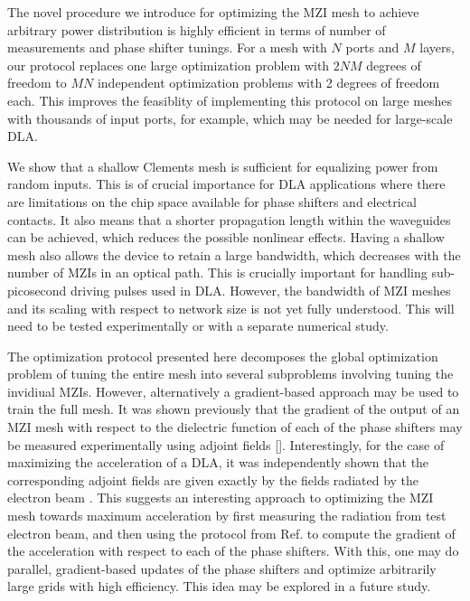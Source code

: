 \documentclass[%
 reprint,
 amsmath,amssymb,
 aps,
prstab,
floatfix,
]{revtex4-1}
\begin{document}
The novel procedure we introduce for optimizing the MZI mesh to achieve arbitrary power distribution is highly efficient in terms of number of measurements and phase shifter tunings.  For a mesh with $N$ ports and $M$ layers, our protocol replaces one large optimization problem with $2NM$ degrees of freedom to $MN$ independent optimization problems with 2 degrees of freedom each.  This improves the feasiblity of implementing this protocol on large meshes with thousands of input ports, for example, which may be needed for large-scale DLA.

We show that a shallow Clements mesh is sufficient for equalizing power from random inputs.  This is of crucial importance for DLA applications where there are limitations on the chip space available for phase shifters and electrical contacts.  It also means that a shorter propagation length within the waveguides can be achieved, which reduces the possible nonlinear effects.  Having a shallow mesh also allows the device to retain a large bandwidth, which decreases with the number of MZIs in an optical path.  This is crucially important for handling sub-picosecond driving pulses used in DLA.  However, the bandwidth of MZI meshes and its scaling with respect to network size is not yet fully understood.  This will need to be tested experimentally or with a separate numerical study.

The optimization protocol presented here decomposes the global optimization problem of tuning the entire mesh into several subproblems involving tuning the invidiual MZIs.  However, alternatively a gradient-based approach may be used to train the full mesh.  It was shown previously \cite{hughes_2018_training} that the gradient of the output of an MZI mesh with respect to the dielectric function of each of the phase shifters may be measured experimentally using adjoint fields []. Interestingly, for the case of maximizing the acceleration of a DLA, it was independently shown that the corresponding adjoint fields are given exactly by the fields radiated by the electron beam \cite{hughes_method_2017}.  This suggests an interesting approach to optimizing the MZI mesh towards maximum acceleration by first measuring the radiation from test electron beam, and then using the protocol from Ref. \cite{hughes_2018_training} to compute the gradient of the acceleration with respect to each of the phase shifters.  With this, one may do parallel, gradient-based updates of the phase shifters and optimize arbitrarily large grids with high efficiency. This idea may be explored in a future study.
\end{document}
